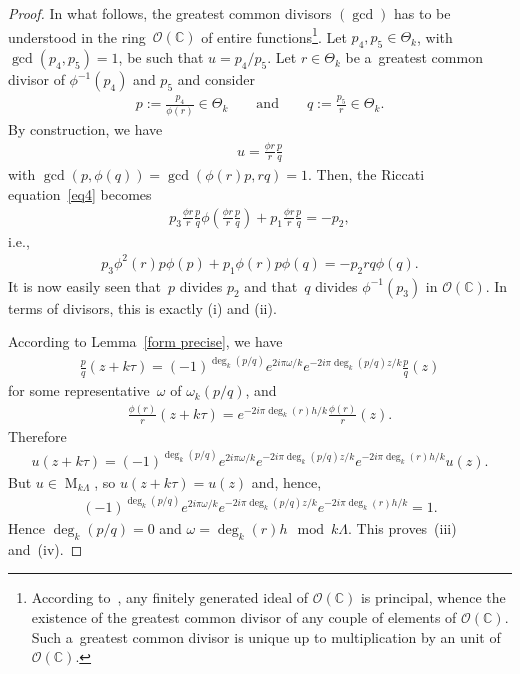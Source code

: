 \documentclass[10pt,a4paper]{amsart}
\numberwithin{equation}{section}
\newcommand{\weight}[1]{\omega_{#1}}
\newcommand{\degr}[1]{\deg_{#1}}
\newcommand{\prodtheta}[1]{\Theta_{#1}}
\begin{document}
\begin{proof}
In what follows, the greatest common divisors $(\gcd)$ has to be understood in the ring~$\mathcal{O}(\mathbb C)$ of
entire functions\footnote{According to~\cite{Helmer}, any f\/initely generated ideal of $\mathcal{O}(\mathbb C)$ is
principal, whence the existence of the greatest common divisor of any couple of elements of $\mathcal{O}(\mathbb C)$.
Such a~greatest common divisor is unique up to multiplication by an unit of $\mathcal{O}(\mathbb C)$.}.
Let $p_{4}, p_{5} \in \prodtheta{k}$, with $\gcd(p_{4},p_{5})=1$, be such that $u=p_{4}/p_{5}$.
Let $r \in \prodtheta{k}$ be a~greatest common divisor of $\phi^{-1}(p_{4})$ and $p_{5}$ and consider
\begin{gather*}
p:=\frac{p_{4}}{\phi(r)} \in \prodtheta{k} \qquad \text{and} \qquad q:=\frac{p_{5}}{r} \in \prodtheta{k}.
\end{gather*}
By construction, we have
\begin{gather*}
u= \frac{\phi r}{r} \frac{p}{q}
\end{gather*}
with $\gcd(p,\phi (q))=\gcd(\phi (r) p,r q)=1$.
Then, the Riccati equation~\eqref{eq4} becomes
\begin{gather*}
p_{3} \frac{\phi r}{r} \frac{p}{q} \phi \left(\frac{\phi r}{r} \frac{p}{q}\right)+p_{1} \frac{\phi r}{r}
\frac{p}{q}=-p_{2},
\end{gather*}
i.e.,
\begin{gather*}
p_{3} \phi^{2}(r) p \phi (p)+p_{1} \phi(r) p \phi(q)=-p_{2} r q\phi(q).
\end{gather*}
It is now easily seen that~$p$ divides $p_{2}$ and that~$q$ divides $\phi^{-1}(p_{3})$ in $\mathcal{O}(\mathbb C)$.
In terms of divisors, this is exactly (i) and (ii).

According to Lemma~\ref{form precise}, we have
\begin{gather*}
\frac{p}{q}(z+k\tau)= (-1)^{\degr{k} (p/q)} e^{2i\pi \omega/k} e^{-2 i\pi \degr{k} (p/q) z/k} \frac{p}{q}(z)
\end{gather*}
for some representative~$\omega$ of $\weight{k}(p/q)$, and
\begin{gather*}
\frac{\phi(r)}{r}(z+k\tau)=e^{- 2 i\pi \degr{k} (r) h/k} \frac{\phi(r)}{r}(z).
\end{gather*}
Therefore
\begin{gather*}
u(z+k\tau)= (-1)^{\degr{k} (p/q)} e^{2i\pi \omega/k} e^{-2 i\pi \degr{k} (p/q) z/k} e^{- 2 i\pi \degr{k} (r) h/k} u(z).
\end{gather*}
But $u \in \operatorname{M}_{k\Lambda}$, so $u(z+k\tau)=u(z)$ and, hence,
\begin{gather*}
(-1)^{\degr{k} (p/q)} e^{2i\pi \omega/k} e^{-2 i\pi \degr{k} (p/q) z/k} e^{- 2 i\pi \degr{k} (r) h/k}=1.
\end{gather*}
Hence $ \degr{k} (p/q)=0$ and $\omega = \degr{k} (r) h \mod k\Lambda$.
This proves~(iii) and~(iv).
\end{proof}
\end{document}
